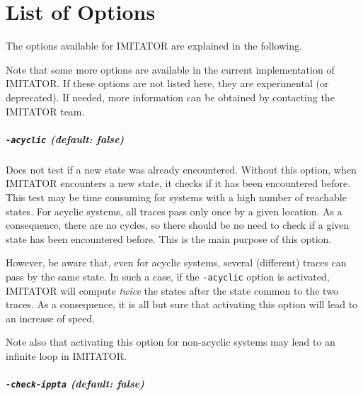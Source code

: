 \documentclass[a4paper,11pt]{report}
\newcommand{\imitator}{\textsf{IMITATOR}}
\newcommand{\styleOption}[1]{\textcolor{optioncolor}{\texttt{#1}}}
\begin{document}
\chapter{List of Options}\label{chapter:options}

The options available for \imitator{} are explained in the following.

Note that some more options are available in the current implementation of \imitator{}.
If these options are not listed here, they are experimental (or deprecated).
If needed, more information can be obtained by contacting the \imitator{} team.


\paragraph{\styleOption{-acyclic} (default: false)}
Does not test if a new state was already encountered.
Without this option, when \imitator{} encounters a new state, it checks if it has been encountered before.
This test may be time consuming for systems with a high number of reachable states.
For acyclic systems, all traces pass only once by a given location.
As a consequence, there are no cycles, so there should be no need to check if a given state has been encountered before.
This is the main purpose of this option.

However, be aware that, even for acyclic systems, several (different) traces can pass by the same state.
In such a case, if the \styleOption{-acyclic} option is activated, \imitator{} will compute \emph{twice} the states after the state common to the two traces.
As a consequence, it is all but sure that activating this option will lead to an increase of speed.

Note also that activating this option for non-acyclic systems may lead to an infinite loop in \imitator{}.


\paragraph{\styleOption{-check-ippta} (default: false)}
\end{document}
